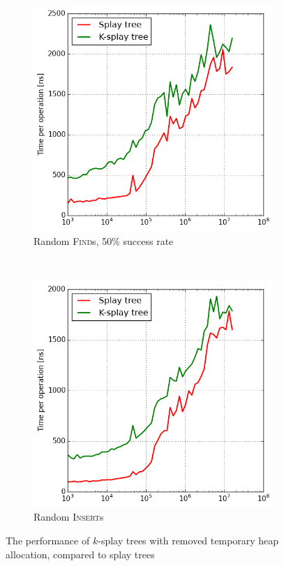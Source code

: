 \begin{figure}
\begin{subfigure}[t]{0.48\textwidth}
	\includegraphics[width=\textwidth]{img/ksplay-noalloc-find-50}
	\caption{Random \textsc{Find}s, 50\% success rate}
\end{subfigure}
~
\begin{subfigure}[t]{0.48\textwidth}
	\includegraphics[width=\textwidth]{img/ksplay-noalloc-insert}
	\caption{Random \textsc{Insert}s}
\end{subfigure}
\caption{The performance of $k$-splay trees with removed temporary heap
	allocation, compared to splay trees}
\label{fig:ksplay-noalloc}
\end{figure}

